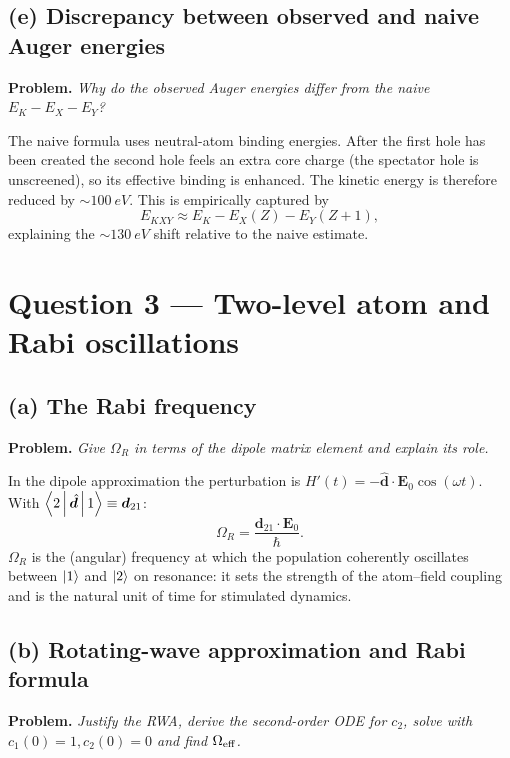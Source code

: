 \documentclass[11pt]{article}
\begin{document}
\subsection*{(e) Discrepancy between observed and naive Auger energies}

\textbf{Problem.} \emph{Why do the observed Auger energies differ from the naive $E_K-E_X-E_Y$?}

The naive formula uses neutral-atom binding energies. After the first hole has been created the second hole feels an extra core charge (the spectator hole is unscreened), so its effective binding is enhanced. The kinetic energy is therefore reduced by $\sim\!\SI{100}{eV}$. This is empirically captured by
\[
E_{KXY}\approx E_K-E_X(Z)-E_Y(Z+1),
\]
explaining the $\sim\SI{130}{eV}$ shift relative to the naive estimate.

\section*{Question 3 --- Two-level atom and Rabi oscillations}

\subsection*{(a) The Rabi frequency}

\textbf{Problem.} \emph{Give $\Omega_R$ in terms of the dipole matrix element and explain its role.}

In the dipole approximation the perturbation is $H'(t)=-\hat{\bm d}\!\cdot\!\bm E_0\cos(\omega t)$. With $\Braket{2|\hat{\bm d}|1}\equiv\bm d_{21}$:
\[
\boxed{\;\Omega_R=\frac{\bm d_{21}\!\cdot\!\bm E_0}{\hbar}.\;}
\]
$\Omega_R$ is the (angular) frequency at which the population coherently oscillates between $\ket1$ and $\ket2$ on resonance: it sets the strength of the atom--field coupling and is the natural unit of time for stimulated dynamics.

\subsection*{(b) Rotating-wave approximation and Rabi formula}

\textbf{Problem.} \emph{Justify the RWA, derive the second-order ODE for $c_2$, solve with $c_1(0)=1,c_2(0)=0$ and find $\Omega_{\rm eff}$.}
\end{document}
